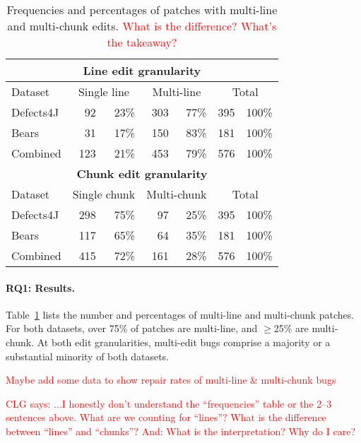 \documentclass[sigconf, timestamp-false, anonymous=true]{acmart}
\newcommand\todo[1]{\textcolor{red}{#1}}
\begin{document}
\begin{table}
{\begin{center}
	\begin{tabular}{l | rr | rr | rr}
		\toprule
		\multicolumn{7}{c}{\textbf{Line edit granularity}} \\
		\midrule
		Dataset & \multicolumn{2}{c}{Single line} & \multicolumn{2}{c}{Multi-line} & \multicolumn{2}{c}{Total} \\
		\midrule
		Defects4J & 92 & 23\% & 303 & 77\% & 395 & 100\%\\ %
		Bears & 31 & 17\% & 150 & 83\% & 181 & 100\%\\ %
		Combined & 123 & 21\% & 453 & 79\% & 576 & 100\% \\ %
		\midrule
		\multicolumn{7}{c}{\textbf{Chunk edit granularity}} \\
		\midrule
		Dataset & \multicolumn{2}{c}{Single chunk} & \multicolumn{2}{c}{Multi-chunk} & \multicolumn{2}{c}{Total} \\
		\midrule
		Defects4J & 298 & 75\% & 97 & 25\% & 395 & 100\%\\
		Bears & 117 & 65\% & 64 & 35\% & 181 & 100\%\\
		Combined & 415 & 72\% & 161 & 28\% & 576 & 100\%\\
		\bottomrule
	\end{tabular}
 \end{center}
}
	\caption{Frequencies and percentages of patches with multi-line and
          multi-chunk edits. \todo{What is the difference? What's the takeaway?}}
	\label{tab:multiedit-frequencies}
\end{table}

\paragraph{RQ1: Results.} 
Table~\ref{tab:multiedit-frequencies} lists the number and percentages of
multi-line and multi-chunk patches. For both datasets, over 75\% of patches are multi-line, 
and $\geq$25\% are multi-chunk. At both edit granularities, multi-edit bugs 
comprise a majority or a substantial minority of both datasets.

\todo{Maybe add some data to show repair rates of multi-line \& multi-chunk bugs}

\todo{CLG says: ...I honestly don't understand the ``frequencies'' table or the
  2--3 sentences above. What are we counting for ``lines''? What is the
  difference between ``lines'' and ``chunks''? And: What is the interpretation?
  Why do I care?}
\end{document}

